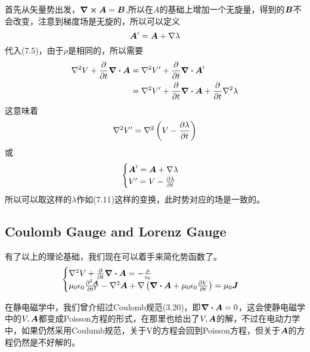 \documentclass[14pt,oneside]{book}
\def \J{\vb*{J}}
\def \B{\vb*{B}}
\def \A{\vb*{A}}
\def \laplace{\nabla^2{}}
\begin{document}
\begin{large}
首先从矢量势出发，$\curl\A=\B$,所以在$A$的基础上增加一个无旋量，得到的$\B$不会改变，注意到梯度场是无旋的，所以可以定义
\begin{equation}
  \A'=\A+\nabla\lambda
\end{equation}
代入(7.5)，由于$\rho$是相同的，所以需要
\begin{equation}
\begin{aligned}
	     \nabla^2 V+\pdv{}{t}\div \A&=\nabla^2 V'+\pdv{}{t}\div \A'\\
	     &=\nabla^2 V'+\pdv{}{t}\div \A+\pdv{}{t}\nabla^2\lambda	\\
\end{aligned}
\end{equation}
这意味着
\begin{equation}
  \laplace V'=\laplace\left(V-\pdv{\lambda}{t}\right)
\end{equation}
或
\begin{align}
\begin{cases}
	    \A'=\A+\nabla\lambda\\
	    V'=V-\pdv{\lambda}{t}
\end{cases}
\end{align}
所以可以取这样的$\lambda$作如(7.11)这样的变换，此时势对应的场是一致的。

\subsection{Coulomb Gauge and Lorenz Gauge}
有了以上的理论基础，我们现在可以着手来简化势函数了。
\begin{align}
\begin{cases}
	  \nabla^2V+\pdv{}{t}\div{\A}=-\frac{\rho}{\epsilon_0}\\
	  \mu_0\epsilon_0\pdv[2]{\A}{t}-\nabla^2\A+\nabla\left(\div\A+\mu_0\epsilon_0\pdv{V}{t} \right)=\mu_0\J
\end{cases}
\end{align}

在静电磁学中，我们曾介绍过Coulomb规范(3.20)，即$\div\A=0$，这会使静电磁学中的$V,\A$都变成Poisson方程的形式，在那里也给出了$V,\A$的解，不过在电动力学中，如果仍然采用Coulumb规范，关于V的方程会回到Poisson方程，但关于$\A$的方程仍然是不好解的。


\end{large}
\end{document}
